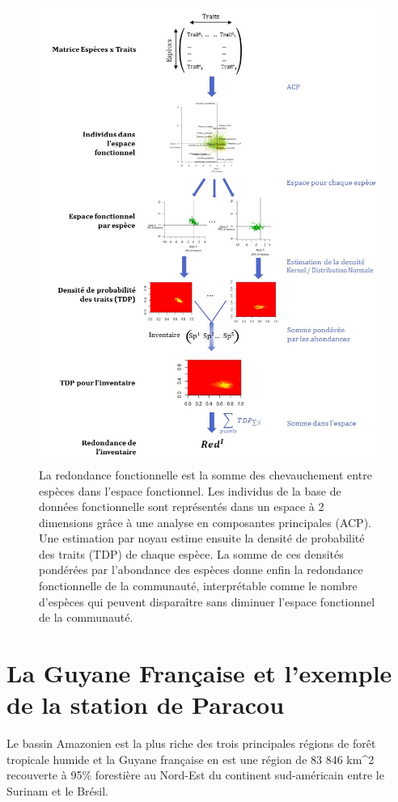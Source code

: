 \documentclass[
  11pt,
  french,
  A4paper,
  extrafontsizes,onecolumn,openright
  ]{memoir}
\begin{document}
\begin{figure}

{\centering \includegraphics[width=0.6\linewidth]{ExternalFig/Fig_MesureRedondance} 

}

\caption{La redondance fonctionnelle est la somme des chevauchement entre espèces dans l'espace fonctionnel. Les individus de la base de données fonctionnelle sont représentés dans un espace à 2 dimensions grâce à une analyse en composantes principales (ACP). Une estimation par noyau estime ensuite la densité de probabilité des traits (TDP) de chaque espèce. La somme de ces densités pondérées par l'abondance des espèces donne enfin la redondance fonctionnelle de la communauté, interprétable comme le nombre d'espèces qui peuvent disparaître sans diminuer l'espace fonctionnel de la communauté.}\label{fig:RedundancyMethod}
\end{figure}

\section{La Guyane Française et l'exemple de la station de
Paracou}\label{la-guyane-francaise-et-lexemple-de-la-station-de-paracou}

Le bassin Amazonien est la plus riche des trois principales régions de
forêt tropicale humide \autocite{Gentry1988} et la Guyane française en
est une région de 83 846 km\^{}2 recouverte à 95\% forestière au
Nord-Est du continent sud-américain entre le Surinam et le Brésil.
\end{document}
